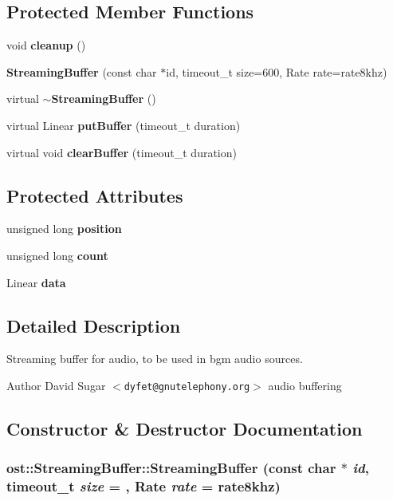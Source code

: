\subsection*{Protected Member Functions}
\begin{DoxyCompactItemize}
\item 
void {\bf cleanup} ()
\item 
{\bf StreamingBuffer} (const char $\ast$id, timeout\_\-t size=600, Rate rate=rate8khz)
\item 
virtual {\bf $\sim$StreamingBuffer} ()
\item 
virtual Linear {\bf putBuffer} (timeout\_\-t duration)
\item 
virtual void {\bf clearBuffer} (timeout\_\-t duration)
\end{DoxyCompactItemize}
\subsection*{Protected Attributes}
\begin{DoxyCompactItemize}
\item 
unsigned long {\bf position}
\item 
unsigned long {\bf count}
\item 
Linear {\bf data}
\end{DoxyCompactItemize}


\subsection{Detailed Description}
Streaming buffer for audio, to be used in bgm audio sources. \begin{DoxyAuthor}{Author}
David Sugar $<${\tt dyfet@gnutelephony.org}$>$ audio buffering 
\end{DoxyAuthor}


\subsection{Constructor \& Destructor Documentation}
\subsubsection[{StreamingBuffer}]{\setlength{\rightskip}{0pt plus 5cm}ost::StreamingBuffer::StreamingBuffer (const char $\ast$ {\em id}, \/  timeout\_\-t {\em size} = {}, \/  Rate {\em rate} = {\ttfamily rate8khz})\hspace{0.3cm}{\ttfamily  [protected]}}\label{classost_1_1_streaming_buffer_a5fb88a5c94c6a5ef38afa5240b01815b}
